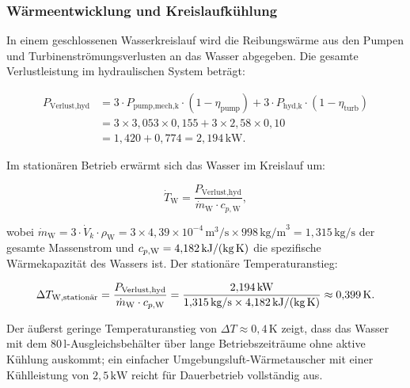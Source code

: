 ﻿\documentclass[a4paper,12pt]{article}
\begin{document}
\subsubsection{Wärmeentwicklung und Kreislaufkühlung}

In einem geschlossenen Wasserkreislauf wird die Reibungswärme aus den Pumpen
und Turbinenströmungsverlusten an das Wasser abgegeben. Die gesamte
Verlustleistung im hydraulischen System beträgt:

\begin{align}
  P_\text{Verlust,hyd}
    &= 3 \cdot P_\text{pump,mech,k} \cdot (1 - \eta_\text{pump})
      + 3 \cdot P_\text{hyd,k} \cdot (1 - \eta_\text{turb}) \\
    & = 3 \times 3{,}053 \times 0{,}155
      + 3 \times 2{,}58 \times 0{,}10 \\
    & = 1{,}420 + 0{,}774
      = 2{,}194\,\text{kW}.
  \label{eq:P_verlust_hyd}
\end{align}

Im stationären Betrieb erwärmt sich das Wasser im Kreislauf um:

\begin{equation}
  \dot{T}_\text{W}
    = \frac{P_\text{Verlust,hyd}}{\dot{m}_\text{W} \cdot c_{p,\text{W}}},
  \label{eq:T_wasser_dot}
\end{equation}

wobei $\dot{m}_\text{W} = 3 \cdot \dot{V}_k \cdot \rho_\text{W}
= 3 \times 4{,}39 \times 10^{-4}\,\text{m}^3/\text{s} \times 998\,\text{kg/m}^3
= 1{,}315\,\text{kg/s}$ der gesamte Massenstrom und
$c_{p,\text{W}} = 4{,}182\,\text{kJ/(kg\,K)}$ die spezifische Wärmekapazität
des Wassers ist. Der stationäre Temperaturanstieg:

\begin{equation}
  \Delta T_\text{W,stationär}
    = \frac{P_\text{Verlust,hyd}}{\dot{m}_\text{W} \cdot c_{p,\text{W}}}
    = \frac{2{,}194\,\text{kW}}{1{,}315\,\text{kg/s} \times 4{,}182\,\text{kJ/(kg\,K)}}
    \approx 0{,}399\,\text{K}.
  \label{eq:DT_W}
\end{equation}

Der äußerst geringe Temperaturanstieg von $\Delta T \approx 0{,}4\,\text{K}$
zeigt, dass das Wasser mit dem $80\,\text{l}$-Ausgleichsbehälter über
lange Betriebszeiträume ohne aktive Kühlung auskommt; ein einfacher
Umgebungsluft-Wärmetauscher mit einer Kühlleistung von $2{,}5\,\text{kW}$
reicht für Dauerbetrieb vollständig aus.

\end{document}
